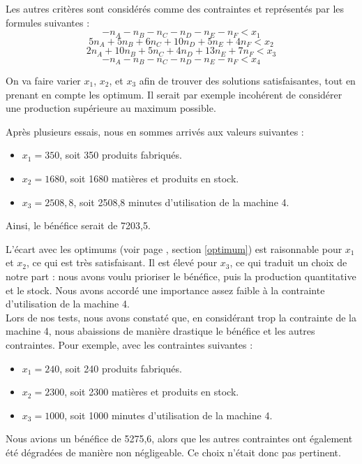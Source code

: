 \documentclass[a4paper,10pt]{article}
\begin{document}
Les autres critères sont considérés comme des contraintes et représentés par les formules suivantes :
$$ - n_A - n_B - n_C - n_D - n_E - n_F < x_1 $$
$$ 5n_A + 5n_B + 6n_C + 10n_D + 5n_E + 4n_F < x_2 $$
$$ 2n_A + 10n_B + 5n_C + 4n_D + 13n_E + 7n_F < x_3 $$
$$ - n_A - n_B - n_C - n_D - n_E - n_F < x_4 $$ 

On va faire varier $x_1$, $x_2$, et $x_3$ afin de trouver des solutions satisfaisantes, tout en prenant en compte les optimum. Il serait par exemple incohérent de considérer une production supérieure au maximum possible.

Après plusieurs essais, nous en sommes arrivés aux valeurs suivantes :
\begin{itemize}
\item $x_1 = 350$, soit 350 produits fabriqués.
\item $x_2 = 1680$, soit 1680 matières et produits en stock.
\item $x_3 = 2508,8$, soit 2508,8 minutes d'utilisation de la machine 4.
\end{itemize}

Ainsi, le bénéfice serait de 7203,5.

L'écart avec les optimums (voir page \pageref{optimum}, section \ref{optimum}) est raisonnable pour $x_1$ et $x_2$, ce qui est très satisfaisant. Il est élevé pour $x_3$, ce qui traduit un choix de notre part : nous avons voulu prioriser le bénéfice, puis la production quantitative et le stock. Nous avons accordé une importance assez faible à la contrainte d'utilisation de la machine 4.
\\

Lors de nos tests, nous avons constaté que, en considérant trop la contrainte de la machine 4, nous abaissions de manière drastique le bénéfice et les autres contraintes. Pour exemple, avec les contraintes suivantes :
\begin{itemize}
\item $x_1 = 240$, soit 240 produits fabriqués.
\item $x_2 = 2300$, soit 2300 matières et produits en stock.
\item $x_3 = 1000$, soit 1000 minutes d'utilisation de la machine 4.
\end{itemize}
Nous avions un bénéfice de 5275,6, alors que les autres contraintes ont également été dégradées de manière non négligeable. Ce choix n'était donc pas pertinent.


\newpage
\end{document}
